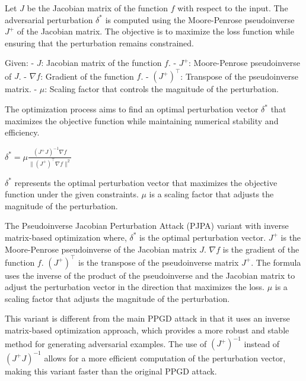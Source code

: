 Let $J$ be the Jacobian matrix of the function $f$ with respect to the input. The adversarial perturbation $\delta^*$ is computed using the Moore-Penrose pseudoinverse $J^{+}$ of the Jacobian matrix. The objective is to maximize the loss function while ensuring that the perturbation remains constrained.

Given:
- $J$: Jacobian matrix of the function $f$.
- $J^{+}$: Moore-Penrose pseudoinverse of $J$.
- $\nabla f$: Gradient of the function $f$.
- $(J^{+})^{\top}$: Transpose of the pseudoinverse matrix.
- $\mu$: Scaling factor that controls the magnitude of the perturbation.

The optimization process aims to find an optimal perturbation vector $\delta^*$ that maximizes the objective function while maintaining numerical stability and efficiency.


$\delta^* = \mu \frac{\left( J^{+}J \right)^{-1} \nabla f}{\| (J^{+})^{\top} \nabla f \|^2}$

$\delta^*$ represents the optimal perturbation vector that maximizes the objective function under the given constraints. $\mu$ is a scaling factor that adjusts the magnitude of the perturbation.

The Pseudoinverse Jacobian Perturbation Attack (PJPA) variant with inverse matrix-based optimization where, $\delta^*$ is the optimal perturbation vector. $J^{+}$ is the Moore-Penrose pseudoinverse of the Jacobian matrix $J$. $\nabla f$ is the gradient of the function $f$. $(J^{+})^{\top}$ is the transpose of the pseudoinverse matrix $J^{+}$. The formula uses the inverse of the product of the pseudoinverse and the Jacobian matrix to adjust the perturbation vector in the direction that maximizes the loss. $\mu$ is a scaling factor that adjusts the magnitude of the perturbation.

This variant is different from the main PPGD attack in that it uses an inverse matrix-based optimization approach, which provides a more robust and stable method for generating adversarial examples. The use of $(J^{+})^{-1}$ instead of $\left( J^+J \right)^{-1}$ allows for a more efficient computation of the perturbation vector, making this variant faster than the original PPGD attack.